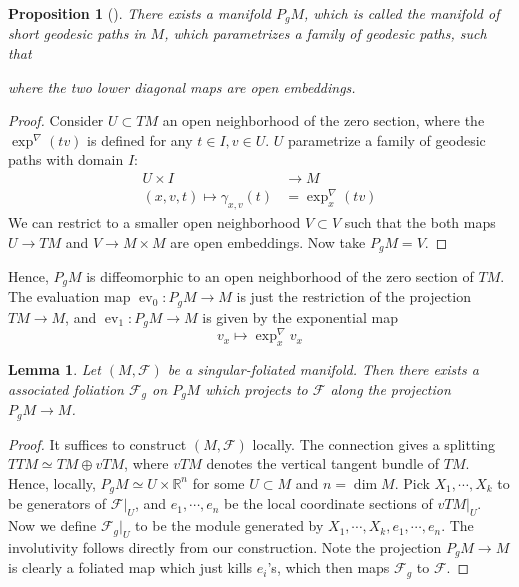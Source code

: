 \documentclass[12pt]{amsart}
\newtheorem{lem}[thm]{Lemma}
\newtheorem{prop}[thm]{Proposition}
\theoremstyle{definition}
\theoremstyle{remark}
\numberwithin{equation}{section}
\newcommand{\CF}{{\mathcal F}}
\newcommand{\R}{{\mathbb{R}}}
\newcommand{\1}{{\mathbb{1}}}
\newcommand{\ev}{\operatorname{ev}}
\begin{document}
\begin{prop}[\cite{BLX21}]\label{ps1}
There exists a manifold $P_g M$, which is called the {\it manifold of short geodesic paths} in $M$, which parametrizes a family of geodesic paths, such that
\begin{center}
\end{center}
where the two lower diagonal maps are open embeddings. 
\end{prop}
\begin{proof}
    Consider $U\subset TM$ an open neighborhood of the zero section, where the $\exp^{\nabla}(tv)$ is defined for any $t\in I, v\in U$. $U$ parametrize a family of geodesic paths with domain $I$:
    \begin{align*}
        U\times I &\to M\\
        (x, v, t)\mapsto \gamma_{x,v}(t) &= \exp^{\nabla}_x(tv)
    \end{align*}
    We can restrict to a smaller open neighborhood $V\subset V$ such that the both maps $U\to TM$ and $V\to M\times M$ are open embeddings. Now take $P_gM = V$. 
\end{proof}
Hence, $P_g M$ is diffeomorphic to an open neighborhood of the zero section of $TM$. The evaluation map $\ev_0: P_g M \to M$ is just the restriction of the projection $TM \to M$, and $\ev_1:P_g M \to M$ is given by the exponential map
\begin{equation*}
    v_x \mapsto \exp^{\nabla}_x v_x
\end{equation*}
\begin{lem}\label{ps2}
Let $(M, \CF)$ be a singular-foliated manifold. Then there exists a associated foliation $\CF_g$ on $P_g M$ which projects to $\CF$ along the projection $P_gM \to M$.
\end{lem}
\begin{proof}
    It suffices to construct $(M, \CF)$ locally. The connection gives a splitting $TTM \simeq TM\oplus vTM$, where $vTM$ denotes the vertical tangent bundle of $TM$. Hence, locally, $P_gM \simeq U\times \R^n$ for some $U\subset M$ and $n= \dim M$. Pick $X_1,\cdots, X_k$ to be generators of $\CF|_U$, and $e_1,\cdots, e_n$ be the local coordinate sections of $vTM|_U$. Now we define $\CF_g|_U$ to be the module generated by $X_1,\cdots, X_k, e_1,\cdots, e_n$. The involutivity follows directly from our construction. Note the projection $P_gM \to M$ is clearly a foliated map which just kills $e_i$'s, which then maps $\CF_g$ to $\CF$. 
\end{proof}
\end{document}
